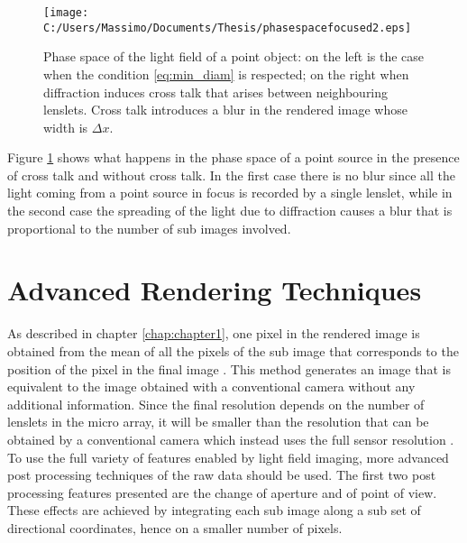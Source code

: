 \begin{figure}[H]
	\centering
	\texttt{[image: C:/Users/Massimo/Documents/Thesis/phasespacefocused2.eps]}
	\caption{\label{fig:crosstalk2}Phase space of the light field of a point object: on the left is the case when the condition \ref{eq:min_diam} is respected; on the right when diffraction induces cross talk that arises between neighbouring lenslets. Cross talk introduces a blur in the rendered image whose width is $\Delta x$. }
\end{figure}
Figure \ref{fig:crosstalk2} shows what happens in the phase space of a point source in the presence of cross talk and without cross talk. In the first case there is no blur since all the light coming from a point source in focus is recorded by a single lenslet, while in the second case the spreading of the light due to diffraction causes a blur that is proportional to the number of sub images involved. 
\section{Advanced Rendering Techniques}
As described in chapter \ref{chap:chapter1}, one pixel in the rendered image is obtained from the mean of all the pixels of the sub image that corresponds to the position of the pixel in the final image \cite{ng2006digital}. This method generates an image that is equivalent to the image obtained with a conventional camera without any additional information. Since the final resolution depends on the number of lenslets in the micro array, it will be smaller than the resolution that can be obtained by a conventional camera which instead uses the full sensor resolution \cite{georgiev2010focused}. To use the full variety of features enabled by light field imaging, more advanced post processing techniques of the raw data should be used. The first two post processing features presented are the change of aperture and of point of view. These effects are achieved by integrating each sub image along a sub set of directional coordinates, hence on a smaller number of pixels. 
